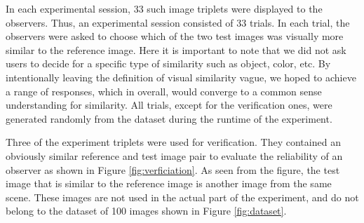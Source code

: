 In each experimental session, 33 such image triplets were displayed to the observers. Thus, an experimental session consisted of 33 trials. In each trial, the observers were asked to choose which of the two test images was visually more similar to the reference image. Here it is important to note that we did not ask users to decide for a specific type of similarity such as object, color, etc. By intentionally leaving the definition of visual similarity vague, we hoped to achieve a range of responses, which in overall, would converge to a common sense understanding for similarity. All trials, except for the verification ones, were generated randomly from the dataset during the runtime of the experiment. 

Three of the experiment triplets were used for verification. They contained an obviously similar reference and test image pair to evaluate the reliability of an observer as shown in Figure \ref{fig:verficiation}. As seen from the figure, the test image that is similar to the reference image is another image from the same scene. These images are not used in the actual part of the experiment, and do not belong to the dataset of 100 images shown in Figure \ref{fig:dataset}.

